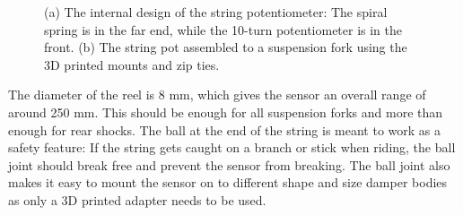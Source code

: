 \documentclass[a4paper,11pt]{article}
\begin{document}
\begin{figure}[H]
    \hfill
    \hfill
    \hfill
    \caption{(a) The internal design of the string potentiometer: The spiral spring is in the far end, while the 10-turn potentiometer is in the front. (b) The string pot assembled to a suspension fork using the 3D printed mounts and zip ties.}
    \label{fig:string_pots}
\end{figure}

The diameter of the reel is 8 mm, which gives the sensor an overall range of around 250 mm. This should be enough for all suspension forks and more than enough for rear shocks. The ball at the end of the string is meant to work as a safety feature: If the string gets caught on a branch or stick when riding, the ball joint should  break free and prevent the sensor from breaking. The ball joint also makes it easy to mount the sensor on to different shape and size damper bodies as only a 3D printed adapter needs to be used.
\end{document}
